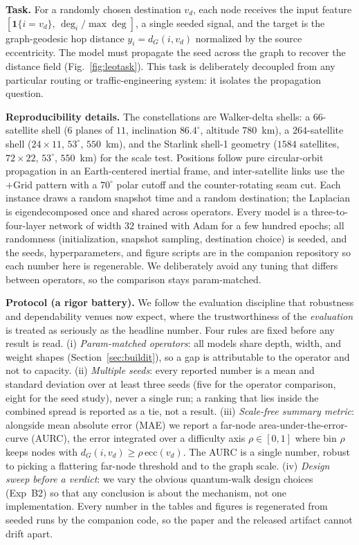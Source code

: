 \textbf{Task.} For a randomly chosen destination $v_d$, each node receives the input
feature $[\mathbf{1}\{i=v_d\},\,\deg_i/\max\deg]$, a single seeded signal, and the
target is the graph-geodesic hop distance $y_i=d_G(i,v_d)$ normalized by the source
eccentricity. The model must propagate the seed across the graph to recover the
distance field (Fig.~\ref{fig:leotask}). This task is deliberately decoupled from any
particular routing or traffic-engineering system: it isolates the propagation question.

\textbf{Reproducibility details.} The constellations are Walker-delta shells: a
$66$-satellite shell ($6$ planes of $11$, inclination $86.4^\circ$, altitude $780$~km), a
$264$-satellite shell ($24\times 11$, $53^\circ$, $550$~km), and the Starlink shell-1
geometry ($1584$ satellites, $72\times 22$, $53^\circ$, $550$~km) for the scale test.
Positions follow pure circular-orbit propagation in an Earth-centered inertial frame, and
inter-satellite links use the $+$Grid pattern with a $70^\circ$ polar cutoff and the
counter-rotating seam cut. Each instance draws a random snapshot time and a random
destination; the Laplacian is eigendecomposed once and shared across operators. Every
model is a three-to-four-layer network of width $32$ trained with Adam for a few hundred
epochs; all randomness (initialization, snapshot sampling, destination choice) is seeded,
and the seeds, hyperparameters, and figure scripts are in the companion repository so each
number here is regenerable. We deliberately avoid any tuning that differs between
operators, so the comparison stays param-matched.

\textbf{Protocol (a rigor battery).} We follow the evaluation discipline that
robustness and dependability venues now expect, where the trustworthiness of the
\emph{evaluation} is treated as seriously as the headline number. Four rules are fixed
before any result is read. (i) \emph{Param-matched operators}: all models share depth,
width, and weight shapes (Section~\ref{sec:buildit}), so a gap is attributable to the
operator and not to capacity. (ii) \emph{Multiple seeds}: every reported number is a
mean and standard deviation over at least three seeds (five for the operator
comparison, eight for the seed study), never a single run; a ranking that lies inside
the combined spread is reported as a tie, not a result. (iii) \emph{Scale-free summary
metric}: alongside mean absolute error (MAE) we report a far-node
area-under-the-error-curve (AURC), the error integrated over a difficulty axis
$\rho\in[0,1]$ where bin $\rho$ keeps nodes with $d_G(i,v_d)\ge\rho\,\mathrm{ecc}(v_d)$.
The AURC is a single number, robust to picking a flattering far-node threshold and to
the graph scale. (iv) \emph{Design sweep before a verdict}: we vary the obvious
quantum-walk design choices (Exp~B2) so that any conclusion is about the mechanism, not
one implementation. Every number in the tables and figures is regenerated from seeded
runs by the companion code, so the paper and the released artifact cannot drift apart.

